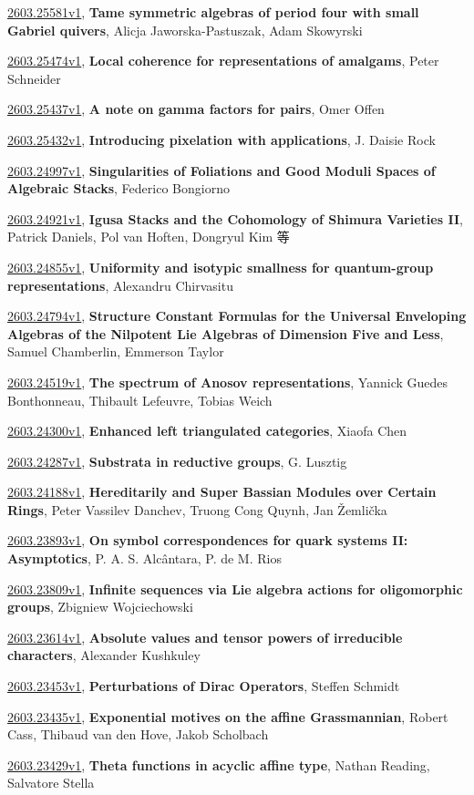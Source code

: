 \documentclass[9pt, a4paper]{article}
\theoremstyle{plain}
\theoremstyle{definition}
\theoremstyle{remark}
\newcommand{\arxiv}[3]{\href{https://arxiv.org/abs/#1}{#1}, \textbf{\textcolor{arxivblue}{#2}}, #3}
\begin{document}
\arxiv{2603.25581v1}{Tame symmetric algebras of period four with small Gabriel quivers}{Alicja Jaworska-Pastuszak, Adam Skowyrski}

\arxiv{2603.25474v1}{Local coherence for representations of amalgams}{Peter Schneider}

\arxiv{2603.25437v1}{A note on gamma factors for pairs}{Omer Offen}

\arxiv{2603.25432v1}{Introducing pixelation with applications}{J. Daisie Rock}

\arxiv{2603.24997v1}{Singularities of Foliations and Good Moduli Spaces of Algebraic Stacks}{Federico Bongiorno}

\arxiv{2603.24921v1}{Igusa Stacks and the Cohomology of Shimura Varieties II}{Patrick Daniels, Pol van Hoften, Dongryul Kim 等}

\arxiv{2603.24855v1}{Uniformity and isotypic smallness for quantum-group representations}{Alexandru Chirvasitu}

\arxiv{2603.24794v1}{Structure Constant Formulas for the Universal Enveloping Algebras of the Nilpotent Lie Algebras of Dimension Five and Less}{Samuel Chamberlin, Emmerson Taylor}

\arxiv{2603.24519v1}{The spectrum of Anosov representations}{Yannick Guedes Bonthonneau, Thibault Lefeuvre, Tobias Weich}

\arxiv{2603.24300v1}{Enhanced left triangulated categories}{Xiaofa Chen}

\arxiv{2603.24287v1}{Substrata in reductive groups}{G. Lusztig}

\arxiv{2603.24188v1}{Hereditarily and Super Bassian Modules over Certain Rings}{Peter Vassilev Danchev, Truong Cong Quynh, Jan Žemlička}

\arxiv{2603.23893v1}{On symbol correspondences for quark systems II: Asymptotics}{P. A. S. Alcântara, P. de M. Rios}

\arxiv{2603.23809v1}{Infinite sequences via Lie algebra actions for oligomorphic groups}{Zbigniew Wojciechowski}

\arxiv{2603.23614v1}{Absolute values and tensor powers of irreducible characters}{Alexander Kushkuley}

\arxiv{2603.23453v1}{Perturbations of Dirac Operators}{Steffen Schmidt}

\arxiv{2603.23435v1}{Exponential motives on the affine Grassmannian}{Robert Cass, Thibaud van den Hove, Jakob Scholbach}

\arxiv{2603.23429v1}{Theta functions in acyclic affine type}{Nathan Reading, Salvatore Stella}
\end{document}
